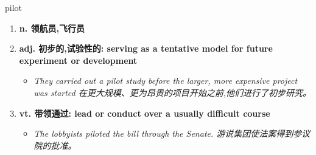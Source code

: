 
\begin{frame}
{\huge pilot}
\begin{center}
\begin{enumerate}\Large
  \item \textbf{n. 领航员,飞行员}
  \item \textbf{adj. 初步的,试验性的: serving as a tentative model for future experiment or development}
  \begin{itemize}
    \item \em{\Large{They carried out a pilot study before the larger, more expensive project was started 在更大规模、更为昂贵的项目开始之前,他们进行了初步研究。}}
  \end{itemize}
  \item \textbf{vt. 带领通过: lead or conduct over a usually difficult course}
  \begin{itemize}
    \item \em{\Large{The lobbyists piloted the bill through the Senate. 游说集团使法案得到参议院的批准。}}
  \end{itemize}
\end{enumerate}
\end{center}
\end{frame}
